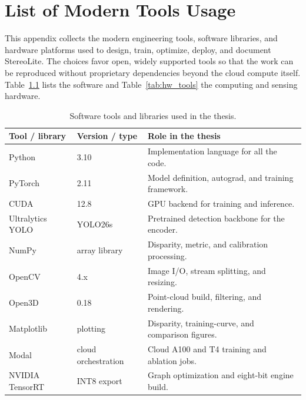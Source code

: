 \chapter{List of Modern Tools Usage}
\label{app:tools}

This appendix collects the modern engineering tools, software libraries,
and hardware platforms used to design, train, optimize, deploy, and
document StereoLite. The choices favor open, widely supported tools so
that the work can be reproduced without proprietary dependencies beyond
the cloud compute itself. Table~\ref{tab:sw_tools} lists the software and
Table~\ref{tab:hw_tools} the computing and sensing hardware.

\begin{table}[H]
\centering
\caption{Software tools and libraries used in the thesis.}
\label{tab:sw_tools}
\small
\begin{tabular}{p{3.1cm}p{2.5cm}p{6.8cm}}
\toprule
Tool / library & Version / type & Role in the thesis\\
\midrule
Python & 3.10 & Implementation language for all the code.\\
PyTorch & 2.11 & Model definition, autograd, and training framework.\\
CUDA & 12.8 & GPU backend for training and inference.\\
Ultralytics YOLO & YOLO26s & Pretrained detection backbone for the encoder.\\
NumPy & array library & Disparity, metric, and calibration processing.\\
OpenCV & 4.x & Image I/O, stream splitting, and resizing.\\
Open3D & 0.18 & Point-cloud build, filtering, and rendering.\\
Matplotlib & plotting & Disparity, training-curve, and comparison figures.\\
Modal & cloud orchestration & Cloud A100 and T4 training and ablation jobs.\\
NVIDIA TensorRT & INT8 export & Graph optimization and eight-bit engine build.\\
\bottomrule
\end{tabular}
\end{table}

